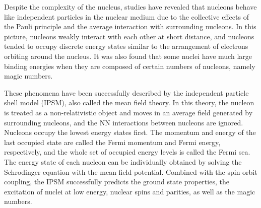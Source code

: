Despite the complexity of the nucleus, studies have revealed that nucleons behave like independent particles in the nuclear medium due to the collective effects of the Pauli principle and the average interaction with surrounding nucleons. In this picture, nucleons weakly interact with each other at short distance, and nucleons tended to occupy discrete energy states similar to the arrangement of electrons orbiting around the nucleus. It was also found that some nuclei have much large binding energies when they are composed of certain numbers of nucleons, namely magic numbers. 

These phenomena have been successfully described by the independent particle shell model (IPSM), also called the mean field theory. In this theory, the nucleon is treated as a non-relativistic object and moves in an average field generated by surrounding nucleons, and the NN interactions between nucleons are ignored. Nucleons occupy the lowest energy states first. The momentum and energy of the last occupied state are called the Fermi momentum and Fermi energy, respectively, and the whole set of occupied energy levels is called the Fermi sea. The energy state of each nucleon can be individually obtained by solving the Schrodinger equation with the mean field potential. Combined with the spin-orbit coupling, the IPSM successfully predicts the ground state properties, the excitation of nuclei at low energy, nuclear spins and parities, as well as the magic numbers. 
  

